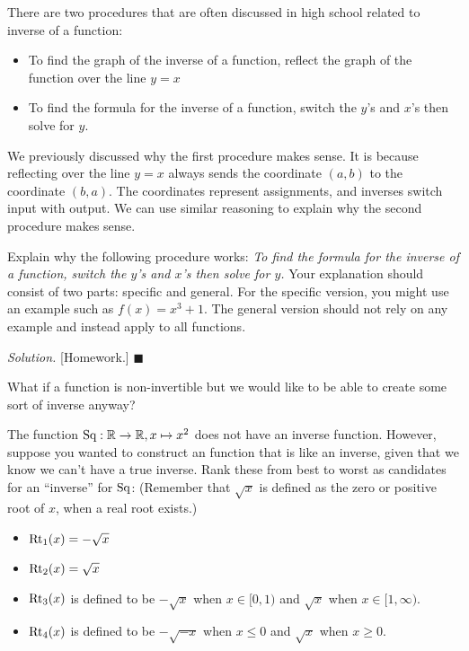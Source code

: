 \documentclass[11pt]{article}
\newenvironment{task}
	{\begin{mdframed}[linecolor=lightgray, linewidth=3pt]\raggedright}
	{\end{mdframed}}
\newcommand\tn{\textnormal}
\newcommand{\R}{\mathbb{R}}
\theoremstyle{definition}
\newenvironment{solution}{{\it Solution.} }{\hfill {\color{lightgray}$\blacksquare$}}
\begin{document}
There are two procedures that are often discussed in high school related to inverse of a function:
	\begin{itemize}
	\item To find the graph of the inverse of a function, reflect the graph of the function over the line $y=x$
	\item To find the formula for the inverse of a function, switch the $y$'s and $x$'s then solve for $y$.
	\end{itemize}
We previously discussed why the first procedure makes sense. It is because reflecting over the line $y=x$ always sends the coordinate $(a,b)$ to the coordinate $(b,a)$. The coordinates represent assignments, and inverses switch input with output. We can use similar reasoning to explain why the second procedure makes sense. 

\begin{task}
Explain why the following procedure works: {\it To find the formula for the inverse of a function, switch the $y$'s and $x$'s then solve for $y$.} Your explanation should consist of two parts: specific and general. For the specific version, you might use an example such as $f(x)=x^3+1$. The general version should not rely on any example and instead apply to all functions.
\end{task}

\begin{solution} [Homework.] \end{solution}

What if a function is non-invertible but we would like to be able to create some sort of inverse anyway? 

\begin{task}
The function $\tn{Sq}:\R\to\R, x\mapsto x^2$ does not have an inverse function. However, suppose you wanted to construct an function that is like an inverse, given that we know we can't have a true inverse.
Rank these from best to worst as candidates for an ``inverse'' for $\tn{Sq}$: (Remember that $\sqrt{x}$ is defined as the zero or positive root of $x$, when a real root exists.)

\begin{itemize}[label=$\circ$]
\item $\tn{Rt}_1(x)=-\sqrt{x}$ 
\item $\tn{Rt}_2(x)=\sqrt{x}$
\item $\tn{Rt}_3(x)$ is defined to be $-\sqrt{x}$ when $x\in[0,1)$ and $\sqrt{x}$ when $x\in [1,\infty)$.
\item $\tn{Rt}_4(x)$ is defined to be $-\sqrt{-x}$ when $x\leq 0$ and $\sqrt{x}$ when $x\geq 0$.
\end{itemize}
\end{task}
\end{document}
